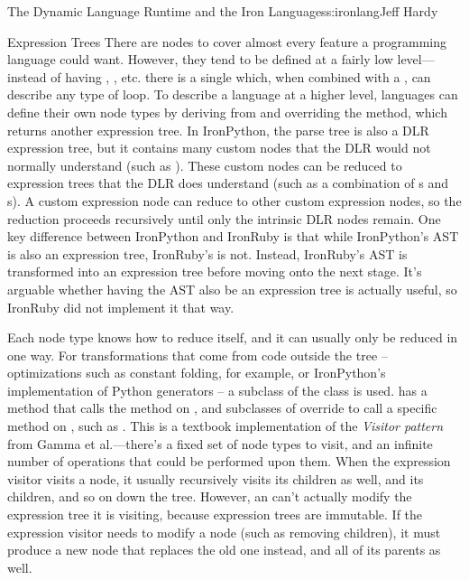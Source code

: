 \begin{aosachapter}{The Dynamic Language Runtime and the Iron Languages}{s:ironlang}{Jeff Hardy}
\begin{aosasect1}{Expression Trees}
There are nodes to cover almost every feature a programming language could want. However, they tend to be defined at a fairly low level---instead of having , , etc. there is a single  which, when combined with a , can describe any type of loop. To describe a language at a higher level, languages can define their own node types by deriving from  and overriding the  method, which returns another expression tree. In IronPython, the parse tree is also a DLR expression tree, but it contains many custom nodes that the DLR would not normally understand (such as ). These custom nodes can be reduced to expression trees that the DLR does understand (such as a combination of s and s). A custom expression node can reduce to other custom expression nodes, so the reduction proceeds recursively until only the intrinsic DLR nodes remain. One key difference between IronPython and IronRuby is that while IronPython's AST is also an expression tree, IronRuby's is not. Instead, IronRuby's AST is transformed into an expression tree before moving onto the next stage. It's arguable whether having the AST also be an expression tree is actually useful, so IronRuby did not implement it that way.

Each node type knows how to reduce itself, and it can usually only be reduced in one way. For transformations that come from code outside the tree -- optimizations such as constant folding, for example, or IronPython's implementation of Python generators -- a subclass of the  class is used.  has a  method that calls the  method on , and subclasses of  override  to call a specific  method on , such as . This is a textbook implementation of the \emph{Visitor pattern} from Gamma et al.---there's a fixed set of node types to visit, and an infinite number of operations that could be performed upon them. When the expression visitor visits a node, it usually recursively visits its children as well, and its children, and so on down the tree. However, an  can't actually modify the expression tree it is visiting, because expression trees are immutable. If the expression visitor needs to modify a node (such as removing children), it must produce a new node that replaces the old one instead, and all of its parents as well.


\end{aosasect1}
\end{aosachapter}
